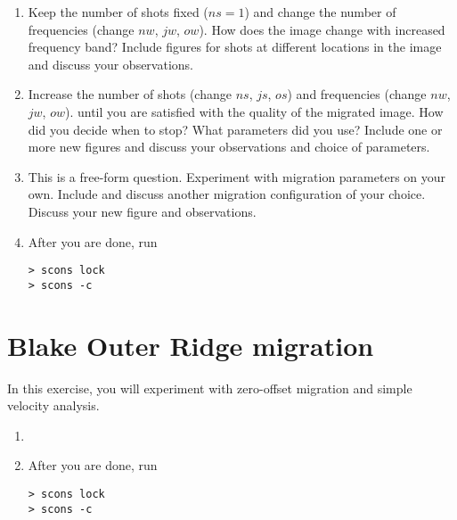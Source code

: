 \begin{enumerate}

\item
Keep the number of shots fixed ($ns=1$) 
and change the number of frequencies 
(change $nw$, $jw$, $ow$).
How does the image change with increased frequency band?
Include figures for shots at different locations in the 
image and discuss your observations.


\item
Increase the number of shots 
(change $ns$, $js$, $os$)
and frequencies 
(change $nw$, $jw$, $ow$).
until you are satisfied with the quality of the migrated image.
How did you decide when to stop?
What parameters did you use?
Include one or more new figures and discuss your 
observations and choice of parameters.


\item
This is a free-form question.
Experiment with migration parameters on your own.
Include and discuss another migration configuration
of your choice. Discuss your new figure and observations.


\item After you are done, run

\begin{verbatim}
> scons lock
> scons -c
\end{verbatim} 
  
\end{enumerate}


\section{Blake Outer Ridge migration}
In this exercise, you will experiment with zero-offset 
migration and simple velocity analysis.



\begin{enumerate}

\item

\item After you are done, run

\begin{verbatim}
> scons lock
> scons -c
\end{verbatim} 
  
\end{enumerate}


